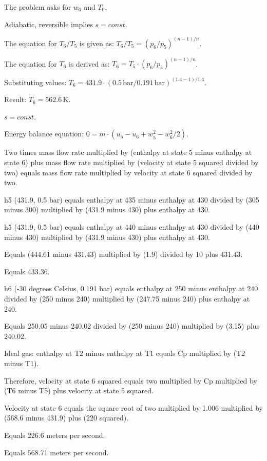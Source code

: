 The problem asks for \( w_6 \) and \( T_0 \).  

Adiabatic, reversible implies \( s = const \).  

The equation for \( T_6 / T_5 \) is given as:  
\( T_6 / T_5 = (p_6 / p_5)^{(n - 1) / n} \).  

The equation for \( T_6 \) is derived as:  
\( T_6 = T_5 \cdot (p_6 / p_5)^{(n - 1) / n} \).  

Substituting values:  
\( T_6 = 431.9 \cdot (0.5 \, \text{bar} / 0.191 \, \text{bar})^{(1.4 - 1) / 1.4} \).  

Result:  
\( T_6 = 562.6 \, \text{K} \).  

\( s = const \).  

Energy balance equation:  
\( 0 = \dot{m} \cdot (u_5 - u_6 + w_5^2 - w_6^2 / 2) \).

Two times mass flow rate multiplied by (enthalpy at state 5 minus enthalpy at state 6) plus mass flow rate multiplied by (velocity at state 5 squared divided by two) equals mass flow rate multiplied by velocity at state 6 squared divided by two.  

h5 (431.9, 0.5 bar) equals enthalpy at 435 minus enthalpy at 430 divided by (305 minus 300) multiplied by (431.9 minus 430) plus enthalpy at 430.  

h5 (431.9, 0.5 bar) equals enthalpy at 440 minus enthalpy at 430 divided by (440 minus 430) multiplied by (431.9 minus 430) plus enthalpy at 430.  

Equals (444.61 minus 431.43) multiplied by (1.9) divided by 10 plus 431.43.  

Equals 433.36.  

h6 (-30 degrees Celsius, 0.191 bar) equals enthalpy at 250 minus enthalpy at 240 divided by (250 minus 240) multiplied by (247.75 minus 240) plus enthalpy at 240.  

Equals 250.05 minus 240.02 divided by (250 minus 240) multiplied by (3.15) plus 240.02.  

Ideal gas: enthalpy at T2 minus enthalpy at T1 equals Cp multiplied by (T2 minus T1).  

Therefore, velocity at state 6 squared equals two multiplied by Cp multiplied by (T6 minus T5) plus velocity at state 5 squared.  

Velocity at state 6 equals the square root of two multiplied by 1.006 multiplied by (568.6 minus 431.9) plus (220 squared).  

Equals 226.6 meters per second.  

Equals 568.71 meters per second.